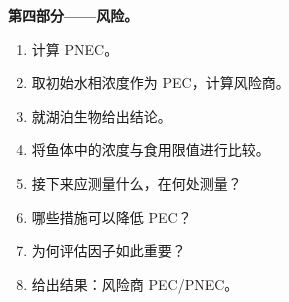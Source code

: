 \begin{problem}
\medskip\noindent\textbf{第四部分——风险。}
\begin{enumerate}[resume]
  \item 计算 PNEC。
  \item 取初始水相浓度作为 PEC，计算风险商。
  \item 就湖泊生物给出结论。
  \item 将鱼体中的浓度与食用限值进行比较。
  \item 接下来应测量什么，在何处测量？
  \item 哪些措施可以降低 PEC？
  \item 为何评估因子如此重要？
  \item 给出结果：风险商 PEC/PNEC。
\end{enumerate}
\end{problem}

